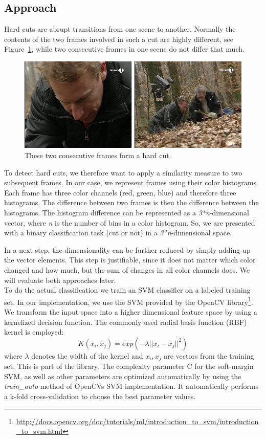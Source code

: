 \subsection{Approach}
\label{sec:hard_cut_approach}

Hard cuts are abrupt transitions from one scene to another.
Normally the contents of the two frames involved in such a cut are highly different, see Figure~\ref{fig:hard_cut_example}, while two consecutive frames in one scene do not differ that much.

\begin{figure}
	\centering
	\includegraphics[scale=.7]{images/hard_cut_example.png}
	\caption{These two consecutive frames form a hard cut.}
	\label{fig:hard_cut_example}
\end{figure}

To detect hard cuts, we therefore want to apply a similarity measure to two subsequent frames.
In our case, we represent frames using their color histograms.
Each frame has three color channels (red, green, blue) and therefore three histograms.
The difference between two frames is then the difference between the histograms.
The histogram difference can be represented as a \emph{3*n}-dimensional vector, where \emph{n} is the number of bins in a color histogram.
So, we are presented with a binary classification task (cut or not) in a \emph{3*n}-dimensional space.

In a next step, the dimensionality can be further reduced by simply adding up the vector elements.
This step is justifiable, since it does not matter which color changed and how much, but the sum of changes in all color channels does.
We will evaluate both approaches later. \\
To do the actual classification we train an SVM classifier on a labeled training set.
In our implementation, we use the SVM provided by the OpenCV library\footnote{\url{http://docs.opencv.org/doc/tutorials/ml/introduction_to_svm/introduction_to_svm.html}}.
We transform the input space into a higher dimensional feature space by using a kernelized decision function. The commonly used radial basis function (RBF) kernel is employed:
$$K(x_i,x_j) = exp(-\lambda || x_i - x_j ||^2)$$
where $\lambda$ denotes the width of the kernel and $x_i, x_j $ are vectors from the training set.
This is part of the library.
The complexity parameter C for the soft-margin SVM, as well as other parameters are optimized automatically by using the \emph{train\_auto} method of OpenCVs SVM implementation.
It automatically performs a k-fold cross-validation to choose the best parameter values.
